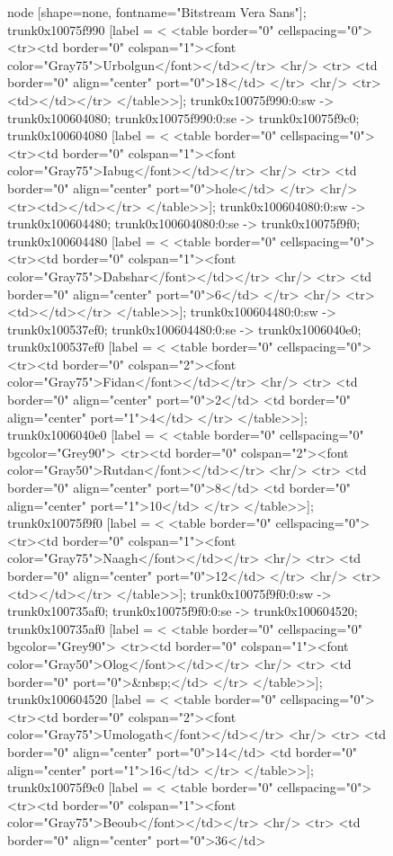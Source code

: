 \documentclass[12pt]{article}
\begin{document}
\begin{figure}
{{	node [shape=none, fontname="Bitstream Vera Sans"];
	trunk0x10075f990 [label = <
<table border="0" cellspacing="0">
	<tr><td border="0" colspan="1"><font color="Gray75">Urbolgun</font></td></tr>
	<hr/>
	<tr>
	<td border="0" align="center" port="0">18</td>
	</tr>
	<hr/>
	<tr><td></td></tr>
</table>>];
	trunk0x10075f990:0:sw -> trunk0x100604080;
	trunk0x10075f990:0:se -> trunk0x10075f9c0;
	trunk0x100604080 [label = <
<table border="0" cellspacing="0">
	<tr><td border="0" colspan="1"><font color="Gray75">Iabug</font></td></tr>
	<hr/>
	<tr>
	<td border="0" align="center" port="0">hole</td>
	</tr>
	<hr/>
	<tr><td></td></tr>
</table>>];
	trunk0x100604080:0:sw -> trunk0x100604480;
	trunk0x100604080:0:se -> trunk0x10075f9f0;
	trunk0x100604480 [label = <
<table border="0" cellspacing="0">
	<tr><td border="0" colspan="1"><font color="Gray75">Dabshar</font></td></tr>
	<hr/>
	<tr>
	<td border="0" align="center" port="0">6</td>
	</tr>
	<hr/>
	<tr><td></td></tr>
</table>>];
	trunk0x100604480:0:sw -> trunk0x100537ef0;
	trunk0x100604480:0:se -> trunk0x1006040e0;
	trunk0x100537ef0 [label = <
<table border="0" cellspacing="0">
	<tr><td border="0" colspan="2"><font color="Gray75">Fidan</font></td></tr>
	<hr/>
	<tr>
	<td border="0" align="center" port="0">2</td>
	<td border="0" align="center" port="1">4</td>
	</tr>
</table>>];
	trunk0x1006040e0 [label = <
<table border="0" cellspacing="0" bgcolor="Grey90">
	<tr><td border="0" colspan="2"><font color="Gray50">Rutdan</font></td></tr>
	<hr/>
	<tr>
	<td border="0" align="center" port="0">8</td>
	<td border="0" align="center" port="1">10</td>
	</tr>
</table>>];
	trunk0x10075f9f0 [label = <
<table border="0" cellspacing="0">
	<tr><td border="0" colspan="1"><font color="Gray75">Naagh</font></td></tr>
	<hr/>
	<tr>
	<td border="0" align="center" port="0">12</td>
	</tr>
	<hr/>
	<tr><td></td></tr>
</table>>];
	trunk0x10075f9f0:0:sw -> trunk0x100735af0;
	trunk0x10075f9f0:0:se -> trunk0x100604520;
	trunk0x100735af0 [label = <
<table border="0" cellspacing="0" bgcolor="Grey90">
	<tr><td border="0" colspan="1"><font color="Gray50">Olog</font></td></tr>
	<hr/>
	<tr>
	<td border="0" port="0">&nbsp;</td>
	</tr>
</table>>];
	trunk0x100604520 [label = <
<table border="0" cellspacing="0">
	<tr><td border="0" colspan="2"><font color="Gray75">Umologath</font></td></tr>
	<hr/>
	<tr>
	<td border="0" align="center" port="0">14</td>
	<td border="0" align="center" port="1">16</td>
	</tr>
</table>>];
	trunk0x10075f9c0 [label = <
<table border="0" cellspacing="0">
	<tr><td border="0" colspan="1"><font color="Gray75">Beoub</font></td></tr>
	<hr/>
	<tr>
	<td border="0" align="center" port="0">36</td>
}}
\end{figure}
\end{document}

